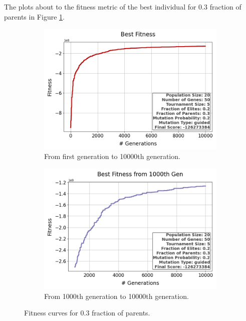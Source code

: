 \documentclass{assignment}
\begin{document}
The plots about to the fitness metric of the best individual for 0.3 fraction of parents in Figure \ref{fig:0.3parents}.
\begin{figure}[H]
    \begin{subfigure}{0.5\textwidth}
        \includegraphics[width=\textwidth]{figures/best_fitness_output_20_50_5_0.2_0.3_0.2_guided.png}
        \caption{From first generation to 10000th generation.}
    \end{subfigure}\hfill
    \begin{subfigure}{0.5\textwidth}
        \includegraphics[width=\textwidth]{figures/best_fitness_1000_output_20_50_5_0.2_0.3_0.2_guided.png}
        \caption{From 1000th generation to 10000th generation.}
    \end{subfigure}
    \caption{Fitness curves for 0.3 fraction of parents.}
\label{fig:0.3parents}
\end{figure}
\end{document}
